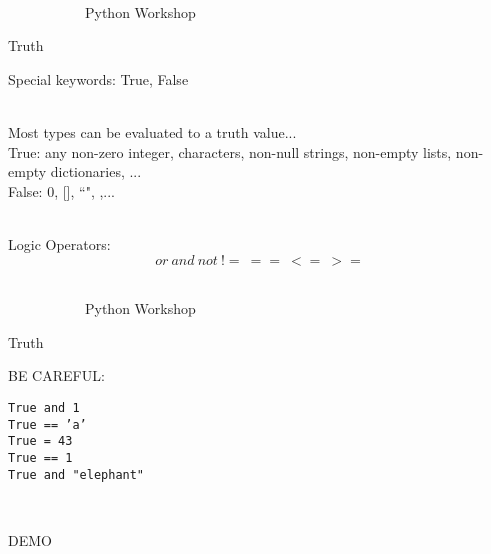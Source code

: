 \documentclass[10pt, xcolor=dvisnames]{beamer}
\begin{document}
\begin{frame}{{\tiny \ \\\vspace{-13pt} \ \ \ \ \ \ \ \ \ \ \ Python Workshop}\\ \centerline{Truth}}
\vspace*{-50pt}

Special keywords: True, False

\ \\
Most types can be evaluated to a truth value...\\
True: any non-zero integer, characters, non-null strings, non-empty lists, non-empty dictionaries, ...\\
False: 0, [], ``", {},...

\ \\
Logic Operators:
\[ or\ and\ not\ !=\ ==\ <=\ >=\]


\end{frame}





\begin{frame}{{\tiny \ \\\vspace{-13pt} \ \ \ \ \ \ \ \ \ \ \ Python Workshop}\\ \centerline{Truth}}
\vspace*{-50pt}


BE CAREFUL:\\
\begin{center}
\texttt{True and 1\\
True == 'a'\\
True = 43\\
True == 1\\
True and "elephant"}\end{center}

\ \\
\centerline{DEMO}

\end{frame}
\end{document}
